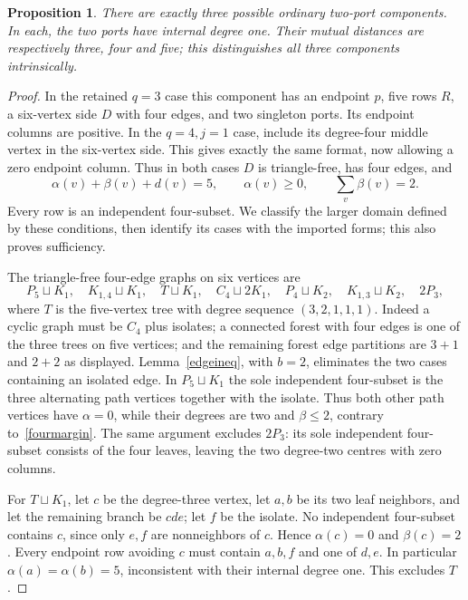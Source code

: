 \documentclass[11pt]{article}
\newtheorem{proposition}[theorem]{Proposition}
\newcommand{\sq}{\sqcup}
\begin{document}
\begin{proposition}\label{rightfour}
There are exactly three possible ordinary two-port components. In each,
the two ports have internal degree one. Their mutual distances are
respectively three, four and five; this distinguishes all three
components intrinsically.
\end{proposition}
\begin{proof}
In the retained $q=3$ case this component has an endpoint $p$, five
rows $R$, a six-vertex side $D$ with four edges, and two singleton
ports. Its endpoint columns are positive. In the $q=4,j=1$ case,
include its degree-four middle vertex in the six-vertex side. This
gives exactly the same format, now allowing a zero endpoint column.
Thus in both cases $D$ is triangle-free, has four edges, and
\begin{equation}\label{fourmargin}
 \alpha(v)+\beta(v)+d(v)=5,\qquad \alpha(v)\geq0,
 \qquad \sum_v\beta(v)=2.
\end{equation}
Every row is an independent four-subset. We classify the larger domain
defined by these conditions, then identify its cases with the imported
forms; this also proves sufficiency.

The triangle-free four-edge graphs on six vertices are
\[
 P_5\sq K_1,\quad K_{1,4}\sq K_1,\quad T\sq K_1,\quad
 C_4\sq2K_1,\quad P_4\sq K_2,\quad
 K_{1,3}\sq K_2,\quad 2P_3,
\]
where $T$ is the five-vertex tree with degree sequence $(3,2,1,1,1)$.
Indeed a cyclic graph must be $C_4$ plus isolates; a connected forest
with four edges is one of the three trees on five vertices; and the
remaining forest edge partitions are $3+1$ and $2+2$ as displayed.
Lemma~\ref{edgeineq}, with $b=2$, eliminates the two cases containing
an isolated edge. In $P_5\sq K_1$ the sole independent four-subset is
the three alternating path vertices together with the isolate. Thus
both other path vertices have $\alpha=0$, while their degrees are two
and $\beta\leq2$, contrary to~\eqref{fourmargin}. The same argument
excludes $2P_3$: its sole independent four-subset consists of the four
leaves, leaving the two degree-two centres with zero columns.

For $T\sq K_1$, let $c$ be the degree-three vertex, let $a,b$ be its
two leaf neighbors, and let the remaining branch be $cde$; let $f$ be
the isolate. No independent four-subset contains $c$, since only $e,f$
are nonneighbors of $c$. Hence $\alpha(c)=0$ and $\beta(c)=2$.
Every endpoint row avoiding $c$ must contain $a,b,f$ and one of $d,e$.
In particular $\alpha(a)=\alpha(b)=5$, inconsistent with their internal
degree one. This excludes $T$.


\end{proof}
\end{document}
